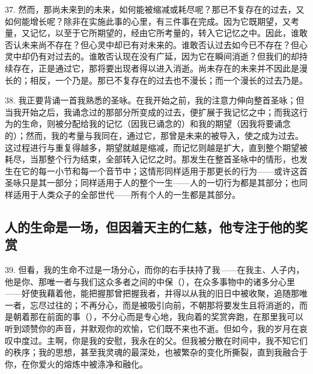 37. 然而，那尚未来到的未来，如何能被缩减或耗尽呢？那已不复存在的过去，又如何能增长呢？除非在实施此事的心里，有三件事在完成。因为它既期望，又考量，又记忆，以至于它所期望的，经由它所考量的，转入它记忆之中。因此，谁敢否认未来尚不存在？但心灵中却已有对未来的。谁敢否认过去如今已不存在？但心灵中却仍有对过去的。谁敢否认现在没有广延，因为它在瞬间消逝？但我们的却持续存在，正是通过它，那将要出现者得以进入消逝。尚未存在的未来并不因此是漫长的；相反，一个乃是。那已不复存在的过去也不漫长；而一个漫长的过去乃是。\par

38. 我正要背诵一首我熟悉的圣咏。在我开始之前，我的注意力伸向整首圣咏；但当我开始之后，我诵念过的那部分所变成的过去，便扩展于我记忆之中；而我这行为的生命，则被分配给我的记忆（因我已诵念的）和我的期望（因我将要诵念的）；然而，我的考量与我同在，通过它，那曾是未来的被导入，使之成为过去。这过程进行与重复得越多，期望就越是缩减，而记忆则越是扩大，直到整个期望被耗尽，当那整个行为结束，全部转入记忆之时。那发生在整首圣咏中的情形，也发生在它的每一小节和每一个音节中；这情形同样适用于那更长的行为——或许这首圣咏只是其一部分；同样适用于人的整个一生——人的一切行为都是其部分；也同样适用于人类众子的全部世代——所有个人的一生都是其部分。\par


\subsection{人的生命是一场，但因着天主的仁慈，他专注于他的奖赏}

39. 但看，我的生命不过是一场分心，而你的右手扶持了我——在我主、人子内，他是你、那唯一者与我们这众多者之间的中保（），在众多事物中的诸多分心里——好使我藉着他，能把握那曾把握我者，并得以从我的旧日中被收聚，追随那唯一者，忘尽过往的；不再分心，而是被吸引向前，不朝那将要发生且将消逝的，而是朝着那在前面的事（），不分心而是专心地，我向着的奖赏奔跑，在那里我可以听到颂赞你的声音，并默观你的欢愉，它们既不来也不逝。但如今，我的岁月在哀叹中度过。主啊，你是我的安慰，我永在的父。但我被分散在时间中，我不知它们的秩序；我的思想，甚至我灵魂的最深处，也被繁杂的变化所撕裂，直到我融合于你，在你爱火的熔炼中被涤净和融化。\par

